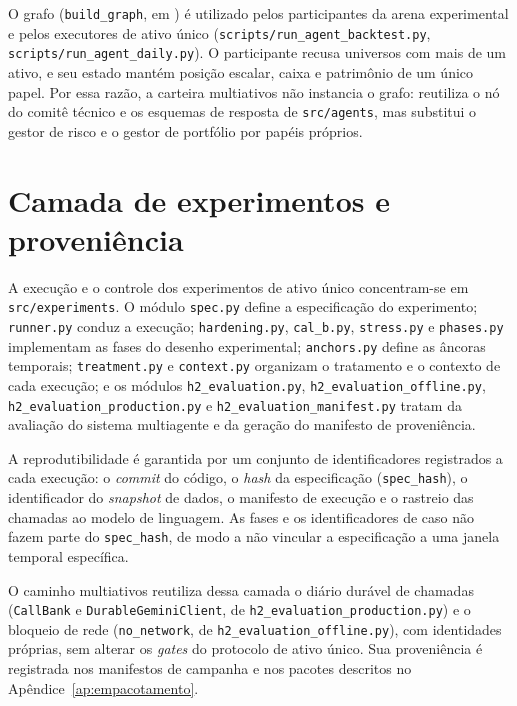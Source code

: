 O grafo (\texttt{build\_graph}, em ) é utilizado pelos participantes da arena experimental e pelos executores de ativo único (\texttt{scripts/run\_agent\_backtest.py}, \texttt{scripts/run\_agent\_daily.py}). O participante recusa universos com mais de um ativo, e seu estado mantém posição escalar, caixa e patrimônio de um único papel. Por essa razão, a carteira multiativos não instancia o grafo: reutiliza o nó do comitê técnico e os esquemas de resposta de \texttt{src/agents}, mas substitui o gestor de risco e o gestor de portfólio por papéis próprios.

\section{Camada de experimentos e proveniência}
\label{sec:arq-experimentos}

A execução e o controle dos experimentos de ativo único concentram-se em \texttt{src/experiments}. O módulo \texttt{spec.py} define a especificação do experimento; \texttt{runner.py} conduz a execução; \texttt{hardening.py}, \texttt{cal\_b.py}, \texttt{stress.py} e \texttt{phases.py} implementam as fases do desenho experimental; \texttt{anchors.py} define as âncoras temporais; \texttt{treatment.py} e \texttt{context.py} organizam o tratamento e o contexto de cada execução; e os módulos \texttt{h2\_evaluation.py}, \texttt{h2\_evaluation\_offline.py}, \texttt{h2\_evaluation\_production.py} e \texttt{h2\_evaluation\_manifest.py} tratam da avaliação do sistema multiagente e da geração do manifesto de proveniência.

A reprodutibilidade é garantida por um conjunto de identificadores registrados a cada execução: o \textit{commit} do código, o \textit{hash} da especificação (\texttt{spec\_hash}), o identificador do \textit{snapshot} de dados, o manifesto de execução e o rastreio das chamadas ao modelo de linguagem. As fases e os identificadores de caso não fazem parte do \texttt{spec\_hash}, de modo a não vincular a especificação a uma janela temporal específica.

O caminho multiativos reutiliza dessa camada o diário durável de chamadas (\texttt{CallBank} e \texttt{DurableGeminiClient}, de \texttt{h2\_evaluation\_production.py}) e o bloqueio de rede (\texttt{no\_network}, de \texttt{h2\_evaluation\_offline.py}), com identidades próprias, sem alterar os \textit{gates} do protocolo de ativo único. Sua proveniência é registrada nos manifestos de campanha e nos pacotes descritos no Apêndice~\ref{ap:empacotamento}.

